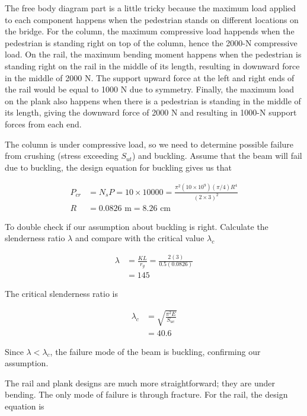 \documentclass[
10pt,
a4paper,
openany,
svgnames,
]{book}
\begin{document}
\begin{exercises}
  The free body diagram part is a little tricky because the maximum load applied to each component happens when the pedestrian stands on different locations on the bridge. For the column, the maximum compressive load happends when the pedestrian is standing right on top of the column, hence the 2000-N compressive load. On the rail, the maximum bending moment happens when the pedestrian is standing right on the rail in the middle of its length, resulting in downward force in the middle of 2000 N. The support upward force at the left and right ends of the rail would be equal to 1000 N due to symmetry. Finally, the maximum load on the plank also happens when there is a pedestrian is standing in the middle of its length, giving the downward force of 2000 N and resulting in 1000-N support forces from each end.

  The column is under compressive load, so we need to determine possible failure from crushing (stress exceeding $S_{ut}$) and buckling. Assume that the beam will fail due to buckling, the design equation for buckling gives us that

  \begin{align*}
    P_{cr} &= N_s P = 10 \times 10000 = \frac{\pi^2 (10 \times 10^9) (\pi/4)R^4}{(2 \times 3)^2} \\
    R &= 0.0826 \text{ m} = 8.26 \text{ cm}
  \end{align*}

  To double check if our assumption about buckling is right. Calculate the slenderness ratio $\lambda$ and compare with the critical value $\lambda_c$

  \begin{align*}
    \lambda &= \frac{KL}{r_g} = \frac{2(3)}{0.5(0.0826)} \\
            &= 145
  \end{align*}

  The critical slenderness ratio is 

  \begin{align*}
    \lambda_c &= \sqrt{\frac{\pi^2 E}{S_{uc}}} \\
              &= 40.6
  \end{align*}

  Since $\lambda < \lambda_c$, the failure mode of the beam is buckling, confirming our assumption.

  The rail and plank designs are much more straightforward; they are under bending. The only mode of failure is through fracture. For the rail, the design equation is 


\end{exercises}
\end{document}
